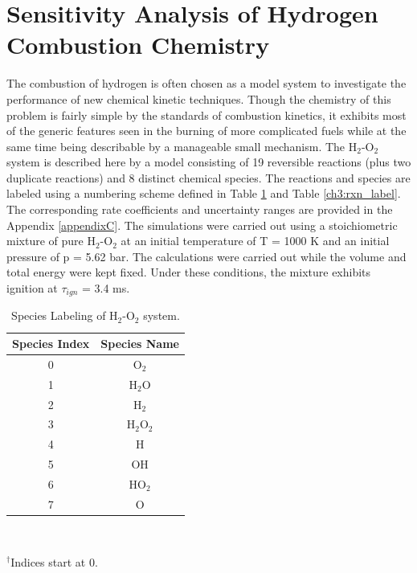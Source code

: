 \section{Sensitivity Analysis of Hydrogen Combustion Chemistry}
\label{sensitivity_a_h2}
The combustion of hydrogen is often chosen as a model system
to investigate the performance of new chemical kinetic
techniques. Though the chemistry of this problem is fairly
simple by the standards of combustion kinetics, it exhibits most
of the generic features seen in the burning of more complicated
fuels while at the same time being describable by a manageable
small mechanism. The H$_2$-O$_2$ system is described here by a
model consisting of 19 reversible reactions (plus two duplicate
reactions) and 8 distinct chemical species. The reactions and
species are labeled using a numbering scheme defined in Table
\ref{ch3:spe_label} and Table \ref{ch3:rxn_label}. The corresponding rate coefficients and uncertainty ranges
are provided in the Appendix \ref{appendixC}. The simulations
were carried out using a stoichiometric mixture of pure H$_2$-O$_2$
at an initial temperature of T = 1000 K and an initial pressure of
p = 5.62 bar. The calculations were carried out while the volume and total energy were kept fixed. Under these
conditions, the mixture exhibits ignition at $\tau_{ign}$ = 3.4 ms.
\begin{table}[htbp]
    \caption[Species Labeling of H$_2$-O$_2$ system]{Species Labeling of H$_2$-O$_2$ system.}
    \begin{center}
    \begin{tabular}{||c|c||} \hline
    Species Index & Species Name\\ \hline
	0  & O$_2$ \\ \hline
	1  & H$_2$O \\ \hline
	2  & H$_2$ \\ \hline
	3  & H$_2$O$_2$ \\ \hline
	4  & H \\ \hline
	5  & OH \\ \hline
	6  & HO$_2$ \\ \hline
	7  & O \\ \hline
	\end{tabular}
   \\ \rule{0mm}{5mm}
   ${}^\dagger$Indices start at 0.		%
\end{center}
\label{ch3:spe_label}
\end{table}

